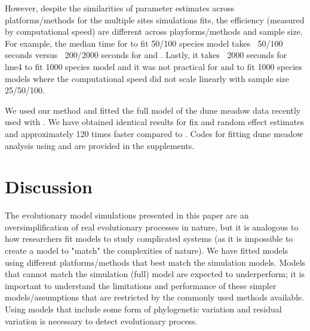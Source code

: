However, despite the similarities of parameter estimates across platforms/methods for the multiple sites simulations fits, the efficiency (measured by computational speed) are different across playforms/methods and sample size.
For example, the median time for  to fit 50/100 species model takes $~$ 50/100 seconds versus $~$ 200/2000 seconds for  and . 
Lastly, it takes $~$ 2000 seconds for lme4 to fit 1000 species model and it was not practical for  and  to fit 1000 species models where the computational speed did not scale linearly with sample size 25/50/100.


We used our method and fitted the full model of the dune meadow data recently used with  \cite{li2017canfun}. 
We have obtained identical results for fix and random effect estimates and approximately 120 times faster compared to . 
Codes for fitting dune meadow analysis using  and  are provided in the supplements. 

\newpage

\section{Discussion}



The evolutionary model simulations presented in this paper are an oversimplification of real evolutionary processes in nature, but it is analogous to how researchers fit models to study complicated systems (as it is impossible to create a model to "match" the complexities of nature).
We have fitted models using different platforms/methods that best match the simulation models. 
Models that cannot match the simulation (full) model are expected to underperform; it is important to understand the limitations and performance of these simpler models/assumptions that are restricted by the commonly used methods available.
Using models that include some form of phylogenetic variation and residual variation is necessary to  detect evolutionary process.

